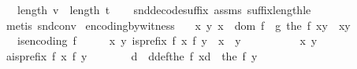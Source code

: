 \begin{isabellebody}
\ \ \ {\isachardoublequoteopen}length\ v\ {\isasymle}\ length\ t{\isachardoublequoteclose}\isanewline
%
\isadelimproof
\ \ %
\endisadelimproof
%
\isatagproof
{}\isamarkupfalse%
\ snd{\isacharunderscore}{\kern0pt}decode{\isacharunderscore}{\kern0pt}suffix\ assms\ suffix{\isacharunderscore}{\kern0pt}length{\isacharunderscore}{\kern0pt}le\ \isanewline
\ \ \isamarkupfalse%
\ {\isacharparenleft}{\kern0pt}metis\ snd{\isacharunderscore}{\kern0pt}conv{\isacharparenright}{\kern0pt}%
\endisatagproof
{\isafoldproof}%
%
\isadelimproof
\isanewline
%
\endisadelimproof
\isanewline
{}\isamarkupfalse%
\ encoding{\isacharunderscore}{\kern0pt}by{\isacharunderscore}{\kern0pt}witness{\isacharcolon}{\kern0pt}\isanewline
\ \ \ {\isachardoublequoteopen}{\isasymAnd}x\ y{\isachardot}{\kern0pt}\ x\ {\isasymin}\ dom\ f\ {\isasymLongrightarrow}\ g\ {\isacharparenleft}{\kern0pt}the\ {\isacharparenleft}{\kern0pt}f\ x{\isacharparenright}{\kern0pt}{\isacharat}{\kern0pt}y{\isacharparenright}{\kern0pt}\ {\isacharequal}{\kern0pt}\ {\isacharparenleft}{\kern0pt}x{\isacharcomma}{\kern0pt}y{\isacharparenright}{\kern0pt}{\isachardoublequoteclose}\isanewline
\ \ \ {\isachardoublequoteopen}is{\isacharunderscore}{\kern0pt}encoding\ f{\isachardoublequoteclose}\isanewline
%
\isadelimproof
%
\endisadelimproof
%
\isatagproof
{}\isamarkupfalse%
\ {\isacharminus}{\kern0pt}\isanewline
\ \ \isamarkupfalse%
\ {\isachardoublequoteopen}{\isasymAnd}x\ y{\isachardot}{\kern0pt}\ is{\isacharunderscore}{\kern0pt}prefix\ {\isacharparenleft}{\kern0pt}f\ x{\isacharparenright}{\kern0pt}\ {\isacharparenleft}{\kern0pt}f\ y{\isacharparenright}{\kern0pt}\ {\isasymLongrightarrow}\ x\ {\isacharequal}{\kern0pt}\ y{\isachardoublequoteclose}\isanewline
\ \ \isamarkupfalse%
\ {\isacharminus}{\kern0pt}\isanewline
\ \ \ \ \isamarkupfalse%
\ x\ y\isanewline
\ \ \ \ \isamarkupfalse%
\ a{\isacharcolon}{\kern0pt}{\isachardoublequoteopen}is{\isacharunderscore}{\kern0pt}prefix\ {\isacharparenleft}{\kern0pt}f\ x{\isacharparenright}{\kern0pt}\ {\isacharparenleft}{\kern0pt}f\ y{\isacharparenright}{\kern0pt}{\isachardoublequoteclose}\isanewline
\ \ \ \ \isamarkupfalse%
\ \isamarkupfalse%
\ d\ \ d{\isacharunderscore}{\kern0pt}def{\isacharcolon}{\kern0pt}{\isachardoublequoteopen}the\ {\isacharparenleft}{\kern0pt}f\ x{\isacharparenright}{\kern0pt}{\isacharat}{\kern0pt}d\ {\isacharequal}{\kern0pt}\ the\ {\isacharparenleft}{\kern0pt}f\ y{\isacharparenright}{\kern0pt}{\isachardoublequoteclose}\isanewline

\end{isabellebody}

